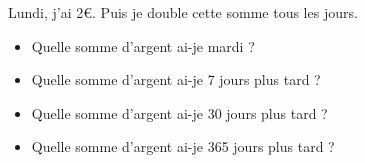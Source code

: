 Lundi, j'ai 2€. Puis je double cette somme tous les jours. 

\begin{itemize}
  \item[1.] Quelle somme d'argent ai-je mardi ?
  \item[2.] Quelle somme d'argent ai-je 7 jours plus tard ?
  \item[3.] Quelle somme d'argent ai-je 30 jours plus tard ?
  \item[4.] Quelle somme d'argent ai-je 365 jours plus tard ?
\end{itemize}



